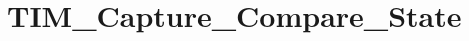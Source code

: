 \hypertarget{group___t_i_m___capture___compare___state}{\section{T\-I\-M\-\_\-\-Capture\-\_\-\-Compare\-\_\-\-State}
\label{group___t_i_m___capture___compare___state}
}
